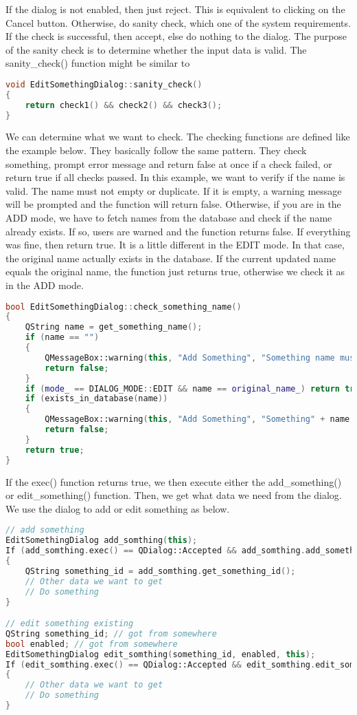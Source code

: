If the dialog is not enabled, then just reject. This is equivalent to clicking on the Cancel button. Otherwise, do sanity check, which one of the system requirements. If the check is successful, then accept, else do nothing to the dialog. The purpose of the sanity check is to determine whether the input data is valid. The sanity\_check() function might be similar to

\begin{lstlisting}[language=C++]
void EditSomethingDialog::sanity_check()
{
    return check1() && check2() && check3();
}
\end{lstlisting}

We can determine what we want to check. The checking functions are defined like the example below. They basically follow the same pattern. They check something, prompt error message and return false at once if a check failed, or return true if all checks passed. In this example, we want to verify if the name is valid. The name must not empty or duplicate. If it is empty, a warning message will be prompted and the function will return false. Otherwise, if you are in the ADD mode, we have to fetch names from the database and check if the name already exists. If so, users are warned and the function returns false. If everything was fine, then return true. It is a little different in the EDIT mode. In that case, the original name actually exists in the database. If the current updated name equals the original name, the function just returns true, otherwise we check it as in the ADD mode.

\begin{lstlisting}[language=C++]
bool EditSomethingDialog::check_something_name()
{
    QString name = get_something_name();
    if (name == "")
    {
        QMessageBox::warning(this, "Add Something", "Something name must not be empty!");
        return false;
    }
    if (mode_ == DIALOG_MODE::EDIT && name == original_name_) return true;
    if (exists_in_database(name))
    {
        QMessageBox::warning(this, "Add Something", "Something" + name + "already exists!")
        return false;
    }
    return true;
} 
\end{lstlisting}

If the exec() function returns true, we then execute either the add\_something() or edit\_something() function. Then, we get what data we need from the dialog. We use the dialog to add or edit something as below.

\begin{lstlisting}[language=C++]
// add something
EditSomethingDialog add_somthing(this);
If (add_somthing.exec() == QDialog::Accepted && add_somthing.add_something())
{
    QString something_id = add_somthing.get_something_id();
    // Other data we want to get
    // Do something
}

// edit something existing
QString something_id; // got from somewhere
bool enabled; // got from somewhere
EditSomethingDialog edit_somthing(something_id, enabled, this);
If (edit_somthing.exec() == QDialog::Accepted && edit_somthing.edit_something())
{
    // Other data we want to get
    // Do something
} 
\end{lstlisting}

